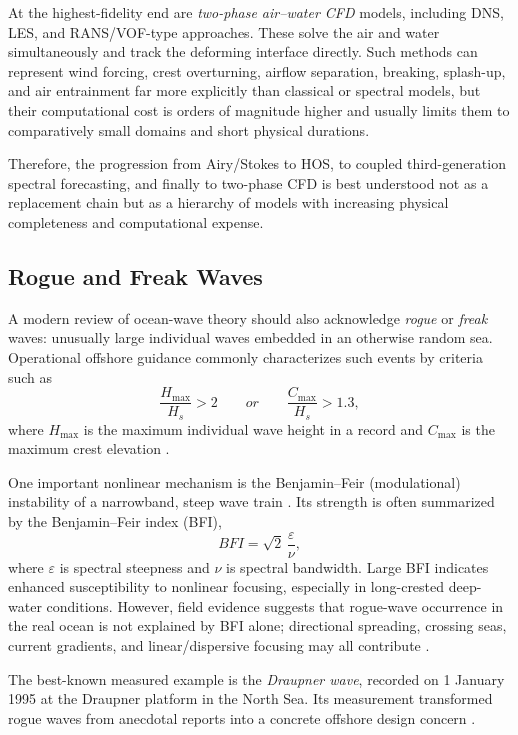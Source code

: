 \documentclass[journal,10pt,twocolumn]{IEEEtran}
\def\mathrm#1{#1}%
\def\text#1{#1}%
\begin{document}
At the highest-fidelity end are \emph{two-phase air--water CFD} models, including DNS,
LES, and RANS/VOF-type approaches.
These solve the air and water simultaneously and track the deforming interface directly.
Such methods can represent wind forcing, crest overturning, airflow separation,
breaking, splash-up, and air entrainment far more explicitly than classical or spectral
models, but their computational cost is orders of magnitude higher and usually limits
them to comparatively small domains and short physical durations.

Therefore, the progression from Airy/Stokes to HOS, to coupled third-generation spectral
forecasting, and finally to two-phase CFD is best understood not as a replacement chain
but as a hierarchy of models with increasing physical completeness and computational
expense.

\subsection{Rogue and Freak Waves}
A modern review of ocean-wave theory should also acknowledge \emph{rogue} or
\emph{freak} waves: unusually large individual waves embedded in an otherwise random sea.
Operational offshore guidance commonly characterizes such events by criteria such as
\begin{equation}
  \frac{H_{\max}}{H_s} > 2
  \qquad \text{or} \qquad
  \frac{C_{\max}}{H_s} > 1.3,
\end{equation}
where $H_{\max}$ is the maximum individual wave height in a record and $C_{\max}$ is the
maximum crest elevation \cite{DNVC205}.

One important nonlinear mechanism is the Benjamin--Feir (modulational) instability of a
narrowband, steep wave train \cite{BenjaminFeir1967}.
Its strength is often summarized by the Benjamin--Feir index (BFI),
\begin{equation}
  \mathrm{BFI} = \sqrt{2}\,\frac{\varepsilon}{\nu},
\end{equation}
where $\varepsilon$ is spectral steepness and $\nu$ is spectral bandwidth.
Large BFI indicates enhanced susceptibility to nonlinear focusing, especially in
long-crested deep-water conditions.
However, field evidence suggests that rogue-wave occurrence in the real ocean is not
explained by BFI alone; directional spreading, crossing seas, current gradients, and
linear/dispersive focusing may all contribute \cite{Gemmrich2022,Hafner2021}.

The best-known measured example is the \emph{Draupner wave}, recorded on
1 January 1995 at the Draupner platform in the North Sea.
Its measurement transformed rogue waves from anecdotal reports into a concrete offshore
design concern \cite{ECMWFDraupner,DNVC205}.
\end{document}

